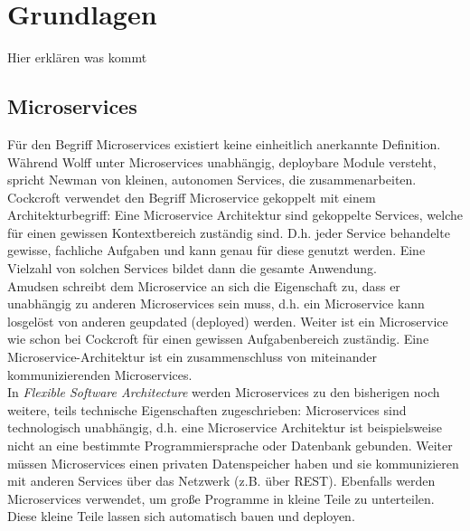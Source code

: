 
\section{Grundlagen}

Hier erklären was kommt

\subsection{Microservices}

Für den Begriff Microservices existiert keine einheitlich anerkannte Definition. Während Wolff unter Microservices unabhängig, deploybare Module versteht\cite{wolff2018mic_praxis}, spricht Newman von kleinen, autonomen Services, die zusammenarbeiten. Cockcroft verwendet den Begriff Microservice gekoppelt mit einem Architekturbegriff: Eine Microservice Architektur sind gekoppelte Services, welche für einen gewissen Kontextbereich zuständig sind.\cite{irakli2016mic_arc} D.h. jeder Service behandelte gewisse, fachliche Aufgaben und kann genau für diese genutzt werden. Eine Vielzahl von solchen Services bildet dann die gesamte Anwendung. \\

Amudsen schreibt dem Microservice an sich die Eigenschaft zu, dass er unabhängig zu anderen Microservices sein muss, d.h. ein Microservice kann losgelöst von anderen geupdated (deployed) werden. Weiter ist ein Microservice wie schon bei Cockcroft für einen gewissen Aufgabenbereich zuständig. Eine Microservice-Architektur ist ein zusammenschluss von miteinander kommunizierenden Microservices.\cite{irakli2016mic_arc} \\

In \textit{Flexible Software Architecture}\cite{wolff2016mic_architectures} werden Microservices zu den bisherigen noch weitere, teils technische Eigenschaften zugeschrieben: Microservices sind technologisch unabhängig, d.h. eine Microservice Architektur ist beispielsweise nicht an eine bestimmte Programmiersprache oder Datenbank gebunden. Weiter müssen Microservices einen privaten Datenspeicher haben und sie kommunizieren mit anderen Services über das Netzwerk (z.B. über REST). Ebenfalls werden Microservices verwendet, um große Programme in kleine Teile zu unterteilen. Diese kleine Teile lassen sich automatisch bauen und deployen. \\

